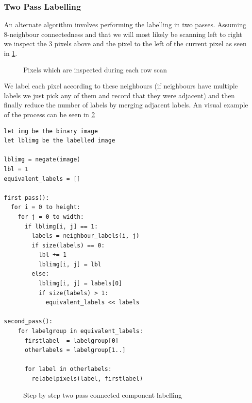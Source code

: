 \subsubsection{Two Pass Labelling}

An alternate algorithm involves performing the labelling in two passes. Assuming 8-neighbour connectedness and that we will most likely be scanning left to right we inspect the 3 pixels above and the pixel to the left of the current pixel as seen in \cref{fig:scan-neighbours}.

\begin{figure}[h!]
  \centering
  
  \caption{Pixels which are inspected during each row scan}
  \label{fig:scan-neighbours}
\end{figure}

We label each pixel according to these neighbours (if neighbours have multiple labels we just pick any of them and record that they were adjacent) and then finally reduce the number of labels by merging adjacent labels. An visual example of the process can be seen in \cref{fig:ccl-two-pass}

\begin{lstlisting}[caption=Iterative Two-Pass Connected Component Labelling, label=alg:ccl-iterative]
let img be the binary image
let lblimg be the labelled image

lblimg = negate(image)
lbl = 1
equivalent_labels = []

first_pass():
  for i = 0 to height:
    for j = 0 to width:
      if lblimg[i, j] == 1:
        labels = neighbour_labels(i, j)
        if size(labels) == 0:
          lbl += 1
          lblimg[i, j] = lbl
        else:
          lblimg[i, j] = labels[0]
          if size(labels) > 1:
            equivalent_labels << labels

second_pass():
    for labelgroup in equivalent_labels:
      firstlabel  = labelgroup[0]
      otherlabels = labelgroup[1..]

      for label in otherlabels:
        relabelpixels(label, firstlabel)
\end{lstlisting}

\begin{figure}[h!]
  \centering






  \caption{Step by step two pass connected component labelling}
  \label{fig:ccl-two-pass}
\end{figure}


